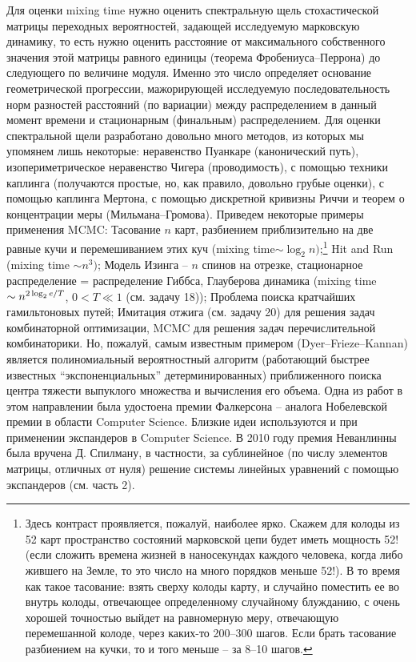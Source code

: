 \begin{remark}
Для оценки mixing time нужно оценить спектральную щель 
стохастической матрицы переходных вероятностей, задающей исследуемую 
марковскую динамику, то есть нужно оценить расстояние от максимального 
собственного значения этой матрицы равного единицы (теорема 
Фробениуса--Перрона) до следующего по величине модуля. Именно это число 
определяет основание геометрической прогрессии, мажорирующей исследуемую 
последовательность норм разностей расстояний (по вариации) между 
распределением в данный момент времени и стационарным (финальным) 
распределением. Для оценки спектральной щели разработано довольно много 
методов, из которых мы упомянем лишь некоторые: неравенство Пуанкаре 
(канонический путь), изопериметрическое неравенство Чигера (проводимость), с 
помощью техники каплинга (получаются простые, но, как правило, довольно 
грубые оценки), с помощью каплинга Мертона, с помощью дискретной кривизны 
Риччи и теорем о концентрации меры (Мильмана--Громова). Приведем некоторые 
примеры применения MCMC: Тасование $n$ карт, разбиением приблизительно на 
две равные кучи и перемешиванием этих куч (mixing time$\sim \log _2 
n)$;\footnote{ Здесь контраст проявляется, пожалуй, наиболее ярко. Скажем 
для колоды из 52 карт пространство состояний марковской цепи будет иметь 
мощность 52! (если сложить времена жизней в наносекундах каждого человека, 
когда либо жившего на Земле, то это число на много порядков меньше 52!). В 
то время как такое тасование: взять сверху колоды карту, и случайно 
поместить ее во внутрь колоды, отвечающее определенному случайному 
блужданию, с очень хорошей точностью выйдет на равномерную меру, отвечающую 
перемешанной колоде, через каких-то 200--300 шагов. Если брать тасование 
разбиением на кучки, то и того меньше -- за 8--10 шагов.} Hit and Run 
(mixing time $\sim n^3)$; Модель Изинга -- $n$ спинов на отрезке, 
стационарное распределение = распределение Гиббса, Глауберова динамика 
(mixing time $\sim n^{{2\log _2 e} \mathord{\left/ {\vphantom {{2\log _2 e} 
T}} \right. \kern-\nulldelimiterspace} T}$, $0<T\ll 1$ (см. задачу 18)); Проблема поиска 
кратчайших гамильтоновых путей; Имитация отжига (см. задачу 20) для решения 
задач комбинаторной оптимизации, MCMC для решения задач перечислительной 
комбинаторики. Но, пожалуй, самым известным примером (Dyer--Frieze--Kannan) 
является полиномиальный вероятностный алгоритм (работающий быстрее известных 
``экспоненциальных'' детерминированных) приближенного поиска центра тяжести 
выпуклого множества и вычисления его объема. Одна из работ в этом 
направлении была удостоена премии Фалкерсона -- аналога Нобелевской премии в 
области Computer Science. Близкие идеи используются и при применении 
экспандеров в Computer Science. В 2010 году премия Неванлинны 
была вручена Д. Спилману, в частности, за сублинейное (по числу элементов 
матрицы, отличных от нуля) решение системы линейных уравнений с помощью 
экспандеров (см. часть 2). 

\end{remark}

